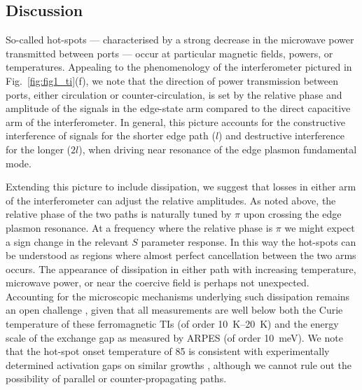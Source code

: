 \subsection{Discussion}
So-called hot-spots --- characterised by a strong decrease in the microwave power transmitted between ports --- occur at particular magnetic fields, powers, or temperatures. Appealing to the phenomenology of the interferometer pictured in Fig.~\ref{fig:fig1_ti}(f), we note that the direction of power transmission between ports, either circulation or counter-circulation, is set by the relative phase and amplitude of the signals in the edge-state arm compared to the direct capacitive arm of the interferometer. In general, this picture accounts for the constructive interference of signals for the shorter edge path ($l$) and destructive interference for the longer ($2l$), when driving near resonance of the edge plasmon fundamental mode.

Extending this picture to include dissipation, we suggest that losses in either arm of the interferometer can adjust the relative amplitudes. As noted above, the relative phase of the two paths is naturally tuned by $\pi$ upon crossing the edge plasmon resonance. At a frequency where the relative phase is $\pi$ we might expect a sign change in the relevant $S$ parameter response. In this way the hot-spots can be understood as regions where almost perfect cancellation between the two arms occurs. The appearance of dissipation in either path with increasing temperature, microwave power, or near the coercive field is perhaps not unexpected. Accounting for the microscopic mechanisms underlying such dissipation remains an open challenge \cite{PhysRevLett.115.057206, wang2013anomalous, bestwick2015precise,wang2014universal, kou2015metal, feng2015observation, li2016origin}, given that all measurements are well below both the Curie temperature of these ferromagnetic TIs (of order \SIrange{10}{20}{\kelvin}) and the energy scale of the exchange gap as measured by ARPES (of order \SI{10}{\milli\electronvolt}).  We note that the hot-spot onset temperature of \SI{85}{\mk} is consistent with experimentally determined activation gaps on similar growths \cite{bestwick2015precise}, although we cannot rule out the possibility of parallel or counter-propagating paths.

